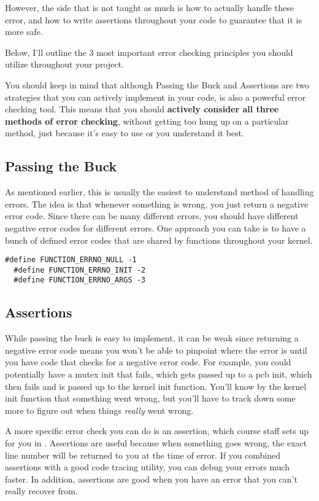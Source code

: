 \documentclass{article}
\begin{document}
However, the side that is not taught as much is how to actually handle these
error, and how to write assertions throughout your code to guarantee that it
is more safe.

Below, I'll outline the 3 most important error checking principles you should
utilize throughout your project.

You should keep in mind that although Passing the Buck and Assertions are two
strategies that you can actively implement in your code,  is also a
powerful error checking tool. This means that you should \textbf{actively
consider all three methods of error checking}, without getting too hung up on
a particular method, just because it's easy to use or you understand it best.

\subsection{Passing the Buck}
As mentioned earlier, this is usually the easiest to understand method of
handling errors. The idea is that whenever something is wrong, you just
return a negative error code. Since there can be many different errors, you
should have different negative error codes for different errors. One approach
you can take is to have a bunch of defined error codes that are shared by
functions throughout your kernel.

\begin{lstlisting}[caption={Negative error code defines}]
  #define FUNCTION_ERRNO_NULL -1
  #define FUNCTION_ERRNO_INIT -2
  #define FUNCTION_ERRNO_ARGS -3
\end{lstlisting}

\subsection{Assertions}
While passing the buck is easy to implement, it can be weak since returning a
negative error code means you won't be able to pinpoint where the error is
until you have code that checks for a negative error code. For example, you
could potentially have a mutex init that fails, which gets passed up to a pcb
init, which then fails and is passed up to the kernel init function. You'll
know by the kernel init function that something went wrong, but you'll have
to track down some more to figure out when things \textit{really} went wrong.

A more specific error check you can do is an assertion, which course staff
sets up for you in . Assertions are useful because when
something goes wrong, the exact line number will be returned to you at the
time of error. If you combined assertions with a good code tracing utility,
you can debug your errors much faster. In addition, assertions are good when
you have an error that you can't really recover from.
\end{document}
